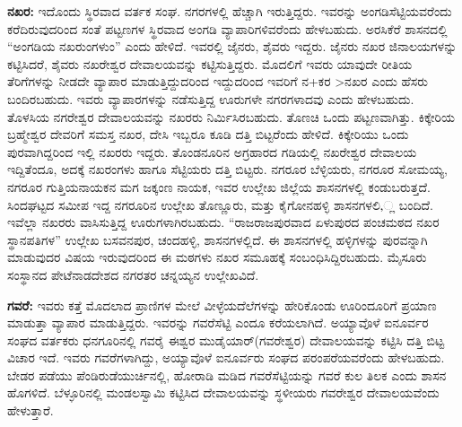 \textbf{ನಖರ: } ಇದೊಂದು ಸ್ಥಿರವಾದ ವರ್ತಕ ಸಂಘ. ನಗರಗಳಲ್ಲಿ ಹೆಚ್ಚಾಗಿ ಇರುತ್ತಿದ್ದರು. ಇವರನ್ನು ಅಂಗಡಿಸೆಟ್ಟಿಯವರೆಂದು ಕರೆದಿರುವುದರಿಂದ ಸಂತೆ ಪಟ್ಟಣಗಳ ಸ್ಥಿರವಾದ ಅಂಗಡಿ ವ್ಯಾಪಾರಿಗಳಿವರೆಂದು ಹೇಳಬಹುದು. ಅರಸಿಕೆರೆ ಶಾಸನದಲ್ಲಿ “ಅಂಗಡಿಯ ನಖರುಂಗಳುಂ” ಎಂದು ಹೇಳಿದೆ. ಇವರಲ್ಲಿ ಜೈನರು, ಶೈವರು ಇದ್ದರು. ಜೈನರು ನಖರ ಜಿನಾಲಯಗಳನ್ನು ಕಟ್ಟಿಸಿದರೆ, ಶೈವರು ನಖರೇಶ್ವರ ದೇವಾಲಯವನ್ನು ಕಟ್ಟಿಸುತ್ತಿದ್ದರು. ಮೊದಲಿಗೆ ಇವರು ಯಾವುದೇ ರೀತಿಯ ತೆರಿಗೆಗಳನ್ನು ನೀಡದೇ ವ್ಯಾಪಾರ ಮಾಡುತ್ತಿದ್ದುದರಿಂದ ಇದ್ದುದರಿಂದ ಇವರಿಗೆ ನ+ಕರ \textgreater  ನಖರ ಎಂದು ಹೆಸರು ಬಂದಿರಬಹುದು. ಇವರು ವ್ಯಾಪಾರಗಳನ್ನು ನಡೆಸುತ್ತಿದ್ದ ಊರುಗಳೇ ನಗರಗಳಾದವು ಎಂದು ಹೇಳಬಹುದು. ತೊಳಸಿಯ ನಗರೇಶ್ವರ ದೇವಾಲಯವನ್ನು ನಖರರು ನಿರ್ಮಿಸಿರಬಹುದು. ತೊಣಚಿ ಒಂದು ಪಟ್ಟಣವಾಗಿತ್ತು. ಕಿಕ್ಕೇರಿಯ ಬ್ರಹ್ಮೇಶ್ವರ ದೇವರಿಗೆ ಸಮಸ್ತ ನಖರ, ದೇಸಿ ಇಬ್ಬರೂ ಕೂಡಿ ದತ್ತಿ ಬಿಟ್ಟರೆಂದು ಹೇಳಿದೆ. ಕಿಕ್ಕೇರಿಯು ಒಂದು ಪುರವಾಗಿದ್ದರಿಂದ ಇಲ್ಲಿ ನಖರರು ಇದ್ದರು. ತೊಂಡನೂರಿನ ಅಗ್ರಹಾರದ ಗಡಿಯಲ್ಲಿ ನಖರೇಶ್ವರ ದೇವಾಲಯ ಇದ್ದಿತೆಂದೂ, ಅದಕ್ಕೆ ನಖರಂಗಳು ಹಾಗೂ ಸೆಟ್ಟಿಯರು ದತ್ತಿ ಬಿಟ್ಟರು. ನಗರೂರ ಬೆಳ್ಳಿಯರು, ನಗರೂರ ಸೋಮಯ್ಯ, ನಗರೂರ ಗುತ್ತಿಯನಾಯಕನ ಮಗ ಜಕ್ಕಂಣ ನಾಯಕ, ಇವರ ಉಲ್ಲೇಖ ಜಿಲ್ಲೆಯ ಶಾಸನಗಳಲ್ಲಿ ಕಂಡುಬರುತ್ತದೆ. ಸಿಂದಘಟ್ಟದ ಸಮೀಪ ಇದ್ದ ನಗರೂರಿನ ಉಲ್ಲೇಖ ತೊಣ್ಣೂರು, ಮತ್ತು ಕೈಗೋನಹಳ್ಳಿ ಶಾಸನಗಳಲಿ,್ಲ ಬಂದಿದೆ. ಇವೆಲ್ಲಾ ನಖರರು ವಾಸಿಸುತ್ತಿದ್ದ ಊರುಗಳಾಗಿರಬಹುದು. “ರಾಜರಾಜಪುರವಾದ ಏಳುಪುರದ ಪಂಚಮಠದ ನಖರ ಸ್ಥಾನಪತಿಗಳ” ಉಲ್ಲೇಖ ಬಸವನಪುರ, ಚಂದಹಳ್ಳಿ, ಶಾಸನಗಳಲ್ಲಿದೆ. ಈ ಶಾಸನಗಳಲ್ಲಿ ಹಳ್ಳಿಗಳನ್ನು ಪುರವನ್ನಾಗಿ ಮಾಡುವುದರ ವಿಷಯ ಇರುವುದರಿಂದ ಈ ಮಠಗಳು ನಖರ ಸಮೂಹಕ್ಕೆ ಸಂಬಂಧಿಸಿದ್ದಿರಬಹುದು. ಮೈಸೂರು ಸಂಸ್ಥಾನದ ಪೇಟೆನಾಡದೇಶದ ನಗರತರ ಚನ್ನಯ್ಯನ ಉಲ್ಲೇಖವಿದೆ. 

\textbf{ಗವರೆ:} ಇವರು ಕತ್ತೆ ಮೊದಲಾದ ಪ್ರಾಣಿಗಳ ಮೇಲೆ ವೀಳ್ಳೆಯದೆಲೆಗಳನ್ನು ಹೇರಿಕೊಂಡು ಊರಿಂದೂರಿಗೆ ಪ್ರಯಾಣ ಮಾಡುತ್ತಾ ವ್ಯಾಪಾರ ಮಾಡುತ್ತಿದ್ದರು. ಇವರನ್ನು ಗವರೆಸೆಟ್ಟಿ ಎಂದೂ ಕರೆಯಲಾಗಿದೆ. ಅಯ್ಯಾವೊಳೆ ಐನೂರ್ವರ ಸಂಘದ ವರ್ತಕರು ಧನಗೂರಿನಲ್ಲಿ ಗವರೈ ಈಶ್ವರ ಮುಡೈಯಾರ್​(ಗವರೇಶ್ವರ) ದೇವಾಲಯವನ್ನು ಕಟ್ಟಿಸಿ ದತ್ತಿ ಬಿಟ್ಟ ವಿಚಾರ ಇದೆ. ಇವರು ಗವರೆಗಳಾಗಿದ್ದು, ಅಯ್ಯಾವೊಳೆ ಐನೂರ್ವರು ಸಂಘದ ಪರಂಪರೆಯವರೆಂದು ಹೇಳಬಹುದು. ಬೇಡರ ಪಡೆಯು ಪೆಂಡಿರುಡೆಯುರ್ಚಿನಲ್ಲಿ, ಹೋರಾಡಿ ಮಡಿದ ಗವರೆಸೆಟ್ಟಿಯನ್ನು ಗವರೆ ಕುಲ ತಿಲಕ ಎಂದು ಶಾಸನ ಹೊಗಳಿದೆ. ಬೆಳ್ಳೂರಿನಲ್ಲಿ ಮಂಡಲಸ್ವಾಮಿ ಕಟ್ಟಿಸಿದ ದೇವಾಲಯವನ್ನು ಸ್ಥಳೀಯರು ಗವರೇಶ್ವರ ದೇವಾಲಯವೆಂದು ಹೇಳುತ್ತಾರೆ. 

